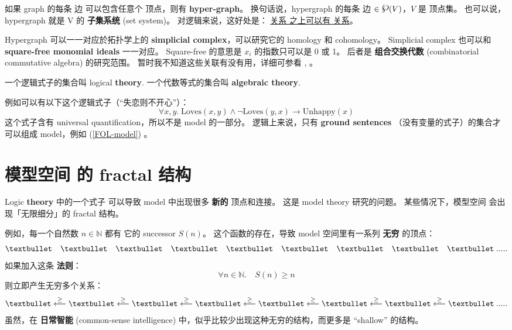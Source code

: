 \documentclass[12pt, orivec]{article}
\newcommand{\powerset}{\raisebox{.15\baselineskip}{\Large\ensuremath{\wp}}}
\begin{document}
\begin{tcolorbox}[breakable, parbox=false]
如果 graph 的每条 边 可以包含任意个 顶点，则有 \textbf{hyper-graph}。 换句话说，hypergraph 的每条 边 $\in \powerset(V)$，$V$ 是 顶点集。 也可以说，hypergraph 就是 V 的 \textbf{子集系统} (set system)。  对逻辑来说，这好处是： \uline{关系 之上可以有 关系}。  

Hypergraph 可以一一对应於拓扑学上的 \textbf{simplicial complex}，可以研究它的 homology 和 cohomology。 Simplicial complex 也可以和 \textbf{square-free monomial ideals} 一一对应。 Square-free 的意思是 $x_i$ 的指数只可以是 0 或 1。  后者是 \textbf{组合交换代数} (combinatorial commutative algebra) 的研究范围。  暂时我不知道这些关联有没有用，详细可参看 \parencite{Brown2013}, \parencite{Miller2005}。
\end{tcolorbox}

一个逻辑式子的集合叫 logical \textbf{theory}.  一个代数等式的集合叫 \textbf{algebraic theory}.

例如可以有以下这个逻辑式子（``失恋则不开心''）：
\begin{equation}
\forall x,y. \; \mbox{Loves}(x,y) \wedge \neg \mbox{Loves}(y,x) \rightarrow \mbox{Unhappy}(x)
\end{equation}
这个式子含有 universal quantification，所以不是 model 的一部分。 逻辑上来说，只有 \textbf{ground sentences} （没有变量的式子）的集合才可以组成 model，例如 (\ref{FOL-model}) 。 

\section{模型空间 的 fractal 结构}

Logic \textbf{theory} 中的一个式子 可以导致 model 中出现很多 \textbf{新的} 顶点和连接。 这是 model theory 研究的问题。  某些情况下，模型空间 会出现「无限细分」的 fractal 结构。 

例如，每一个自然数 $n \in \mathbb{N}$ 都有 它的 successor $S(n)$。 这个函数的存在，导致 model 空间里有一系列 \textbf{无穷} 的顶点：
\begin{equation}
\textbullet \quad \textbullet \quad \textbullet \quad \textbullet \quad \textbullet \quad \textbullet \quad \textbullet \quad \textbullet \quad \textbullet \; .....
\end{equation}
如果加入这条 \textbf{法则}：
\begin{equation}
\forall n \in \mathbb{N}. \quad S(n) \ge n
\end{equation}
则立即产生无穷多个关系：
\begin{equation}
\textbullet \stackrel{\ge}{\longleftarrow} \textbullet \stackrel{\ge}{\longleftarrow} \textbullet \stackrel{\ge}{\longleftarrow} \textbullet \stackrel{\ge}{\longleftarrow} \textbullet \stackrel{\ge}{\longleftarrow} \textbullet \stackrel{\ge}{\longleftarrow} \textbullet \stackrel{\ge}{\longleftarrow} \textbullet \; .....
\end{equation}
虽然，在 \textbf{日常智能} (common-sense intelligence) 中，似乎比较少出现这种无穷的结构，而更多是 ``shallow'' 的结构。 
\end{document}
